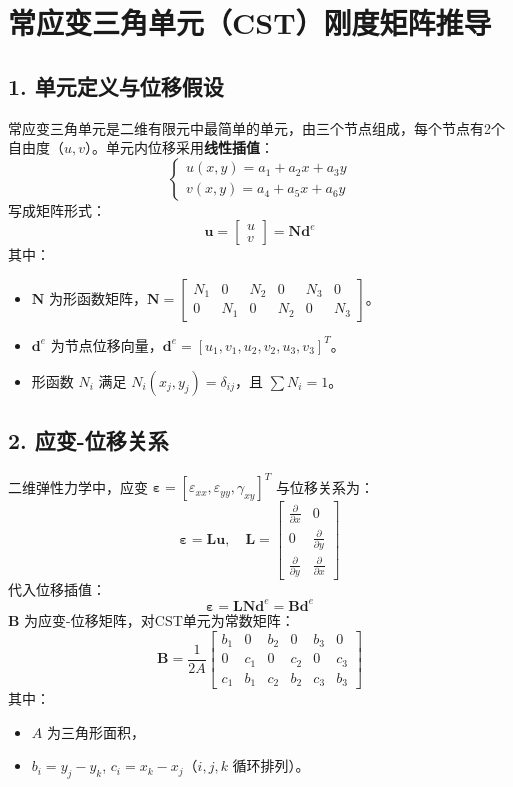 \documentclass{ctexart}
\begin{document}
\section*{常应变三角单元（CST）刚度矩阵推导}

\subsection*{1. 单元定义与位移假设}
常应变三角单元是二维有限元中最简单的单元，由三个节点组成，每个节点有2个自由度（$u, v$）。单元内位移采用\textbf{线性插值}：
\[
\begin{cases}
u(x,y) = a_1 + a_2 x + a_3 y \\
v(x,y) = a_4 + a_5 x + a_6 y 
\end{cases}
\]
写成矩阵形式：
\[
\mathbf{u} = \begin{bmatrix} u \\ v \end{bmatrix} = \mathbf{N} \mathbf{d}^e
\]
其中：
\begin{itemize}
  \item $\mathbf{N}$ 为形函数矩阵，$\mathbf{N} = \begin{bmatrix} N_1 & 0 & N_2 & 0 & N_3 & 0 \\ 0 & N_1 & 0 & N_2 & 0 & N_3 \end{bmatrix}$。
  \item $\mathbf{d}^e$ 为节点位移向量，$\mathbf{d}^e = [u_1, v_1, u_2, v_2, u_3, v_3]^T$。
  \item 形函数 $N_i$ 满足 $N_i(x_j, y_j) = \delta_{ij}$，且 $\sum N_i = 1$。
\end{itemize}

\subsection*{2. 应变-位移关系}
二维弹性力学中，应变 $\bm{\varepsilon} = [\varepsilon_{xx}, \varepsilon_{yy}, \gamma_{xy}]^T$ 与位移关系为：
\[
\bm{\varepsilon} = \mathbf{L} \mathbf{u}, \quad \mathbf{L} = \begin{bmatrix} \frac{\partial}{\partial x} & 0 \\ 0 & \frac{\partial}{\partial y} \\ \frac{\partial}{\partial y} & \frac{\partial}{\partial x} \end{bmatrix}
\]
代入位移插值：
\[
\bm{\varepsilon} = \mathbf{L} \mathbf{N} \mathbf{d}^e = \mathbf{B} \mathbf{d}^e
\]
$\mathbf{B}$ 为应变-位移矩阵，对CST单元为常数矩阵：
\[
\mathbf{B} = \frac{1}{2A} \begin{bmatrix} 
b_1 & 0 & b_2 & 0 & b_3 & 0 \\
0 & c_1 & 0 & c_2 & 0 & c_3 \\
c_1 & b_1 & c_2 & b_2 & c_3 & b_3 
\end{bmatrix}
\]
其中：
\begin{itemize}
  \item $A$ 为三角形面积，
  \item $b_i = y_j - y_k$, $c_i = x_k - x_j$（$i,j,k$ 循环排列）。
\end{itemize}
\end{document}
